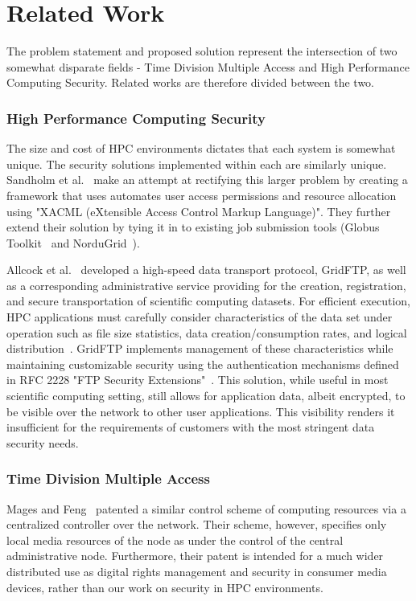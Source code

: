 \documentclass[oneside,12pt]{memoir}
\begin{document}
\chapter{Related Work}
The problem statement and proposed solution represent the intersection of two somewhat disparate fields - Time Division Multiple Access and High Performance Computing Security. Related works are therefore divided between the two. 
\subsection{High Performance Computing Security}
The size and cost of HPC environments dictates that each system is somewhat unique. The security solutions implemented within each are similarly unique. Sandholm et al.~\cite{sandholm2004ogsa} make an attempt at rectifying this larger problem by creating a framework that uses automates user access permissions and resource allocation using "XACML (eXtensible Access Control Markup Language)". They further extend their solution by tying it in to existing job submission tools (Globus Toolkit~\cite{globus_toolkit} and NorduGrid~\cite{nordugrid}). 

Allcock et al.~\cite{allcock2001secure} developed a high-speed data transport protocol, GridFTP, as well as a corresponding administrative service providing for the creation, registration, and secure transportation of scientific computing datasets. For efficient execution, HPC applications must carefully consider characteristics of the data set under operation such as file size statistics, data creation/consumption rates, and logical distribution~\cite{chervenak2000data}. GridFTP implements management of these characteristics while maintaining customizable security using the authentication mechanisms defined in RFC 2228 "FTP Security Extensions"~\cite{horowitz1997ftp}. This solution, while useful in most scientific computing setting, still allows for application data, albeit encrypted, to be visible over the network to other user applications. This visibility renders it insufficient for the requirements of customers with the most stringent data security needs.
\subsection{Time Division Multiple Access}
Mages and Feng~\cite{mages1999method} patented a similar control scheme of computing resources via a centralized controller over the network. Their scheme, however, specifies only local media resources of the node as under the control of the central administrative node. Furthermore, their patent is intended for a much wider distributed use as digital rights management and security in consumer media devices, rather than our work on security in HPC environments.
\end{document}
